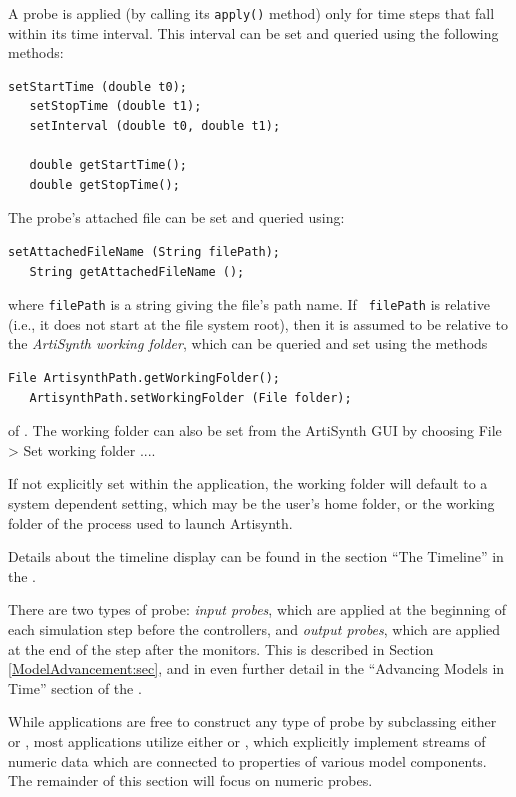 A probe is applied (by calling its {\tt apply()} method) only for time
steps that fall within its time interval. This interval can be set and
queried using the following methods:
\begin{lstlisting}[]
   setStartTime (double t0);
   setStopTime (double t1);
   setInterval (double t0, double t1);
 
   double getStartTime();
   double getStopTime();
\end{lstlisting}
%
The probe's attached file can be set and queried using:
\begin{lstlisting}[]
   setAttachedFileName (String filePath);
   String getAttachedFileName ();
\end{lstlisting}
%
where {\tt filePath} is a string giving the file's path name.  If {\tt
filePath} is relative (i.e., it does not start at the file system root), then
it is assumed to be relative to the {\it ArtiSynth working folder}, which
can be queried and set using the methods
%
\begin{lstlisting}[]
   File ArtisynthPath.getWorkingFolder();
   ArtisynthPath.setWorkingFolder (File folder);
\end{lstlisting}
%
of .
The working folder can also be set from the ArtiSynth GUI
by choosing {\sf File > Set working folder ...}.
\begin{sideblock}
If not explicitly set within the application, the working folder will default
to a system dependent setting, which may be the user's home folder, or the
working folder of the process used to launch Artisynth.
\end{sideblock}

Details about the timeline display can be found in
the section ``The Timeline'' in the
.

There are two types of probe: {\it input probes}, which are applied at the
beginning of each simulation step before the controllers, and {\it output
probes}, which are applied at the end of the step after the monitors. This is
described in Section \ref{ModelAdvancement:sec}, and in even further detail in
the ``Advancing Models in Time'' section of the
.

While applications are free to construct any type of probe by subclassing
either  or
, most applications
utilize either  or
, which
explicitly implement streams of numeric data which are connected to
properties of various model components.  The remainder of this section
will focus on numeric probes.

